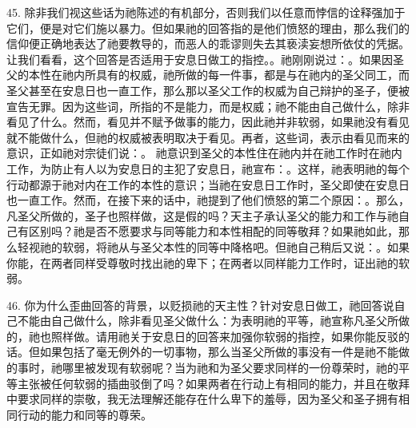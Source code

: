 45. 除非我们视这些话为祂陈述的有机部分，否则我们以任意而悖信的诠释强加于它们，便是对它们施以暴力。但如果祂的回答指的是他们愤怒的理由，那么我们的信仰便正确地表达了祂要教导的，而恶人的乖谬则失去其亵渎妄想所依仗的凭据。让我们看看，这个回答是否适用于安息日做工的指控。。祂刚刚说过：。如果因圣父的本性在祂内所具有的权威，祂所做的每一件事，都是与在祂内的圣父同工，而圣父甚至在安息日也一直工作，那么那以圣父工作的权威为自己辩护的圣子，便被宣告无罪。因为这些词，所指的不是能力，而是权威；祂不能由自己做什么，除非看见了什么。然而，看见并不赋予做事的能力，因此祂并非软弱，如果祂没有看见就不能做什么，但祂的权威被表明取决于看见。再者，这些词，表示由看见而来的意识，正如祂对宗徒们说：。 祂意识到圣父的本性住在祂内并在祂工作时在祂内工作，为防止有人以为安息日的主犯了安息日，祂宣布：。这样，祂表明祂的每个行动都源于祂对内在工作的本性的意识；当祂在安息日工作时，圣父即使在安息日也一直工作。然而，在接下来的话中，祂提到了他们愤怒的第二个原因：。那么，凡圣父所做的，圣子也照样做，这是假的吗？天主子承认圣父的能力和工作与祂自己有区别吗？祂是否不愿要求与同等能力和本性相配的同等敬拜？如果祂如此，那么轻视祂的软弱，将祂从与圣父本性的同等中降格吧。但祂自己稍后又说：。如果你能，在两者同样受尊敬时找出祂的卑下；在两者以同样能力工作时，证出祂的软弱。\par

46. 你为什么歪曲回答的背景，以贬损祂的天主性？针对安息日做工，祂回答说自己不能由自己做什么，除非看见圣父做什么：为表明祂的平等，祂宣称凡圣父所做的，祂也照样做。请用祂关于安息日的回答来加强你软弱的指控，如果你能反驳的话。但如果包括了毫无例外的一切事物，那么当圣父所做的事没有一件是祂不能做的事时，祂哪里被发现有软弱呢？当为祂和为圣父要求同样的一份尊荣时，祂的平等主张被任何软弱的插曲驳倒了吗？如果两者在行动上有相同的能力，并且在敬拜中要求同样的崇敬，我无法理解还能存在什么卑下的羞辱，因为圣父和圣子拥有相同行动的能力和同等的尊荣。\par


